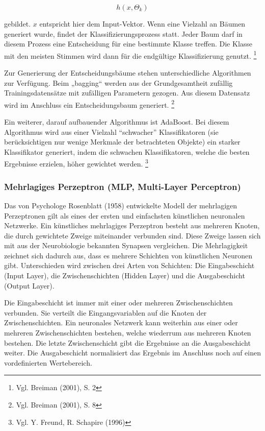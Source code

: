 \documentclass[a4paper,12pt]{article}
\begin{document}
\begin{equation}
h(x,\Theta_k)
\end{equation}

gebildet. $x$ entspricht hier dem Input-Vektor. Wenn eine Vielzahl an Bäumen generiert wurde, findet der Klassifizierungsprozess statt. Jeder Baum darf in diesem Prozess eine Entscheidung für eine bestimmte Klasse treffen. Die Klasse mit den meisten Stimmen wird dann für die endgültige Klassifizierung genutzt. \footnote{Vgl. Breiman (2001), S. 2}

Zur Generierung der Entscheidungsbäume stehen unterschiedliche Algorithmen zur Verfügung. Beim „bagging“ werden aus der Grundgesamtheit zufällig Trainingsdatensätze mit zufälligen Parametern gezogen. Aus diesem Datensatz wird im Anschluss ein Entscheidungsbaum generiert. \footnote{Vgl. Breiman (2001), S. 8}

Ein weiterer, darauf aufbauender Algorithmus ist AdaBoost. Bei diesem Algorithmus wird aus einer Vielzahl “schwacher” Klassifikatoren (sie berücksichtigen nur wenige Merkmale der betrachteten Objekte) ein starker Klassifikator generiert, indem die schwachen Klassifikatoren, welche die besten Ergebnisse erzielen, höher gewichtet werden. \footnote{Vgl. Y. Freund, R. Schapire (1996)}

\subsubsection{Mehrlagiges Perzeptron (MLP, Multi-Layer Perceptron)}


Das von Psychologe Rosenblatt (1958) entwickelte Modell der mehrlagigen Perzeptronen gilt als eines der ersten und einfachsten künstlichen neuronalen Netzwerke. 
Ein künstliches mehrlagiges Perzeptron besteht aus mehreren Knoten, die durch gewichtete Zweige miteinander verbunden sind. Diese Zweige lassen sich mit aus der Neurobiologie bekannten Synapsen vergleichen. Die Mehrlagigkeit zeichnet sich dadurch aus, dass es mehrere Schichten von künstlichen Neuronen gibt. Unterschieden wird zwischen drei Arten von Schichten: Die Eingabeschicht (Input Layer), die Zwischenschichten (Hidden Layer) und die Ausgabeschicht (Output Layer). 

Die Eingabeschicht ist immer mit einer oder mehreren Zwischenschichten verbunden. Sie verteilt die Eingangsvariablen auf die Knoten der Zwischenschichten. 
Ein neuronales Netzwerk kann weiterhin aus einer oder mehreren Zwischenschichten bestehen, welche wiederrum aus mehreren Knoten bestehen. Die letzte Zwischenschicht gibt die Ergebnisse an die Ausgabeschicht weiter. Die Ausgabeschicht normalisiert das Ergebnis im Anschluss noch auf einen vordefinierten Wertebereich. 
\end{document}
